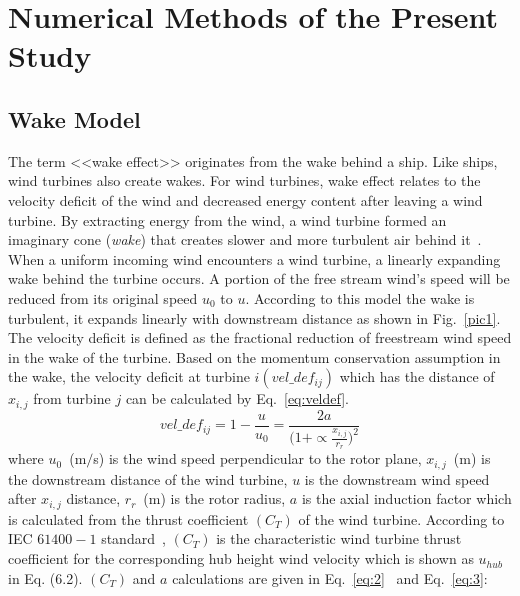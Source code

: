 \documentclass[]{iptconf}
\begin{document}
\section{Numerical Methods of the Present Study} \label{sec:numericalmethods}
\subsection{Wake Model} \label{subsec:wakemodel}
The term <<wake effect>> originates from the wake behind a ship. Like ships, wind
turbines also create wakes. For wind turbines, wake effect relates to the velocity
deficit of the wind and decreased energy content after leaving a wind turbine. By
extracting energy from the wind, a wind turbine formed an imaginary cone (\textit{wake})
that creates slower and more turbulent air behind it~\cite{Diamond2011}.
When a uniform incoming wind encounters a wind turbine, a linearly expanding
wake behind the turbine occurs. A portion of the free stream wind's speed will
be reduced from its original speed $u_0$ to $u$. According to this model the wake is
turbulent, it expands linearly with downstream distance as shown in Fig.~\ref{pic1}. The
velocity deficit is defined as the fractional reduction of freestream wind speed in
the wake of the turbine. Based on the momentum conservation assumption in the
wake, the velocity deficit at turbine $i(vel\_def_{ij})$ which has the distance of $x_{i,j}$
from turbine $j$ can be calculated by Eq.~\eqref{eq:veldef}.
\begin{equation}
	\label{eq:veldef}
	vel\_def_{ij}=1-\dfrac{u}{u_0}=\dfrac{2a}{\Bigg(1+\propto\frac{x_{i,j}}{r_r}\Bigg)^2}
\end{equation}
where $u_0$~(m$/$s) is the wind speed perpendicular to the rotor plane, $x_{i,j}$~(m) is the
downstream distance of the wind turbine, $u$ is the downstream wind speed after $x_{i,j}$
distance, $r_r$~(m) is the rotor radius, $a$ is the axial induction factor which is calculated
from the thrust coefficient $(C_T)$ of the wind turbine.
According to IEC $61400-1$ standard~\cite{IEC2009}, $(C_T)$ is the characteristic wind turbine
thrust coefficient for the corresponding hub height wind velocity which is shown as
$u_{hub}$ in Eq. (6.2). $(C_T)$ and $a$ calculations are given in Eq.~\eqref{eq:2}~\cite{Frohboese2010} and Eq.~\eqref{eq:3}:
\end{document}
